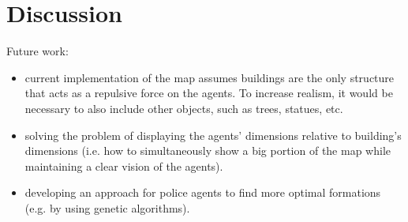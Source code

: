 \documentclass[9pt]{pnas-new}
\begin{document}
\section*{Discussion}

Future work:
\begin{itemize}
\item current implementation of the map assumes buildings are the only structure that acts as a repulsive force on the agents. To increase realism, it would be necessary to also include other objects, such as trees, statues, etc.
\item solving the problem of displaying the agents' dimensions relative to building's dimensions (i.e. how to simultaneously show a big portion of the map while maintaining a clear vision of the agents).
\item developing an approach for police agents to find more optimal formations (e.g. by using genetic algorithms). 
\end{itemize}


\showacknow %


\begin{multicols}{2}
\section*{\bibname}

\end{multicols}
\end{document}
